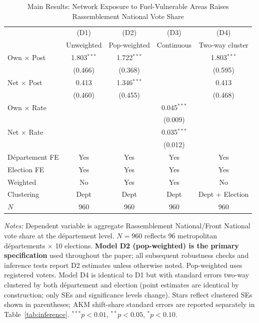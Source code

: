 \documentclass[12pt]{article}
\newcommand{\rn}{Rassemblement National}
\newcommand{\fn}{Front National}
\newcommand{\dept}{d\'{e}partement}
\newcommand{\depts}{d\'{e}partements}
\begin{document}
\begin{table}[H]
\centering
\caption{Main Results: Network Exposure to Fuel-Vulnerable Areas Raises \rn{} Vote Share}
\label{tab:dept}
\begin{threeparttable}
\begin{tabular}{@{}lcccc@{}}
\toprule
 & (D1) & (D2) & (D3) & (D4) \\
 & Unweighted & Pop-weighted & Continuous & Two-way cluster \\
\midrule
Own $\times$ Post & 1.803$^{***}$ & 1.722$^{***}$ & & 1.803$^{***}$ \\
 & (0.466) & (0.368) & & (0.595) \\[3pt]
Net $\times$ Post & 0.413 & 1.346$^{***}$ & & 0.413 \\
 & (0.460) & (0.455) & & (0.468) \\[3pt]
Own $\times$ Rate & & & 0.045$^{***}$ & \\
 & & & (0.009) & \\[3pt]
Net $\times$ Rate & & & 0.035$^{***}$ & \\
 & & & (0.012) & \\[3pt]
\midrule
D\'{e}partement FE & Yes & Yes & Yes & Yes \\
Election FE & Yes & Yes & Yes & Yes \\
Weighted & No & Yes & Yes & No \\
Clustering & Dept & Dept & Dept & Dept + Election \\
$N$ & 960 & 960 & 960 & 960 \\
\bottomrule
\end{tabular}
\begin{tablenotes}
\small
\item \textit{Notes:} Dependent variable is aggregate \rn{}/\fn{} vote share at the \dept{} level. $N = 960$ reflects 96 metropolitan \depts{} $\times$ 10 elections. \textbf{Model D2 (pop-weighted) is the primary specification} used throughout the paper; all subsequent robustness checks and inference tests report D2 estimates unless otherwise noted. Pop-weighted uses registered voters. Model D4 is identical to D1 but with standard errors two-way clustered by both \dept{} and election (point estimates are identical by construction; only SEs and significance levels change). Stars reflect clustered SEs shown in parentheses; AKM shift-share standard errors are reported separately in Table~\ref{tab:inference}. $^{***}p<0.01$, $^{**}p<0.05$, $^{*}p<0.10$.
\end{tablenotes}
\end{threeparttable}
\end{table}
\end{document}
